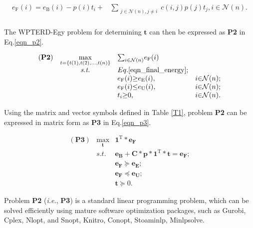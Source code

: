 \documentclass[journal,10pt]{IEEEtran}
\begin{document}
\begin{equation}
\label{eqn_final_energy}
\begin{array}{rl}
e_\text{F}(i){=}e_\text{B}(i){-}p(i)t_i
{+}&\mathop{\sum}\limits_{\substack{j{\in}\mathcal{N}(n),j{\neq}i}}
c(i,j)p(j)t_j,i{\in}\mathcal{N}(n).\\
\end{array}
\end{equation}

The WPTERD-Egy problem for determining $\mathbf{t}$ can then be expressed as \textbf{P2} in Eq.\eqref{eqn_p2}.

\begin{equation}
\label{eqn_p2}
\begin{array}{rcll}
(\textbf{P2})&\mathop{\max}\limits_{t{=}\{t(1),t(2),\ldots,t(n)\}}&{\sum}_{i{\in}\mathcal{N}(n)}e_\text{F}(i)\\
&\textit{s.t.}
&Eq.\eqref{eqn_final_energy};&\\
&&e_\text{F}(i){\geq}e_\text{E}(i),&i{\in}\mathcal{N}(n);\\
&&e_\text{F}(i){\leq}e_\text{U}(i),&i{\in}\mathcal{N}(n);\\
&&t_i{\geq}0,&i{\in}\mathcal{N}(n).
\end{array}
\end{equation}

Using the matrix and vector symbols defined in Table \ref{T1}, problem \textbf{P2} can be expressed in matrix form as \textbf{P3} in Eq.\eqref{eqn_p3}.

\begin{equation}
\label{eqn_p3}
\begin{array}{rcl}
(\textbf{P3})&\mathop{\max}\limits_{\mathbf{t}}&\mathbf{1}^\text{T}{*}\mathbf{e_\text{F}}\\
&\textit{s.t.}
&\mathbf{e_\text{B}}{+}\mathbf{C}{*}\mathbf{p}{*}\mathbf{1}^{\text{T}}{*}\mathbf{t}{=}\mathbf{e_\text{F}};\\
&&\mathbf{e_\text{F}}{\succeq}\mathbf{e_\text{E}};\\
&&\mathbf{e_\text{F}}{\preceq}\mathbf{e_\text{U}};\\
&&\mathbf{t}{\succeq}0.
\end{array}
\end{equation}

Problem \textbf{P2} (\textit{i.e.}, \textbf{P3}) is a standard linear programming problem, which can be solved efficiently using mature software optimization packages, such as Gurobi, Cplex, Nlopt, and Snopt, Knitro, Conopt, Stoaminlp, Minlpsolve.
\end{document}
